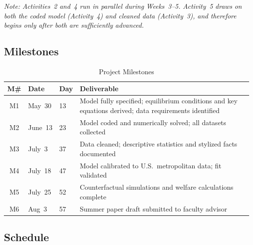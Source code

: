 \noindent\textit{Note: Activities~2 and~4 run in parallel during Weeks~3--5.
Activity~5 draws on both the coded model (Activity~4) and cleaned data
(Activity~3), and therefore begins only after both are sufficiently
advanced.}

\subsection*{Milestones}

\begin{table}[htbp]
\centering
\caption{Project Milestones}
\begin{tabular}{cllp{8.5cm}}
\toprule
\textbf{M\#} & \textbf{Date} & \textbf{Day} & \textbf{Deliverable} \\
\midrule
M1 & May~30  & 13 & Model fully specified; equilibrium conditions and
                    key equations derived; data requirements identified \\
M2 & June~13 & 23 & Model coded and numerically solved;
                    all datasets collected \\
M3 & July~3  & 37 & Data cleaned; descriptive statistics and
                    stylized facts documented \\
M4 & July~18 & 47 & Model calibrated to U.S.\ metropolitan data;
                    fit validated \\
M5 & July~25 & 52 & Counterfactual simulations and welfare
                    calculations complete \\
M6 & Aug~3   & 57 & Summer paper draft submitted to faculty advisor \\
\bottomrule
\end{tabular}
\end{table}

\subsection*{Schedule}

